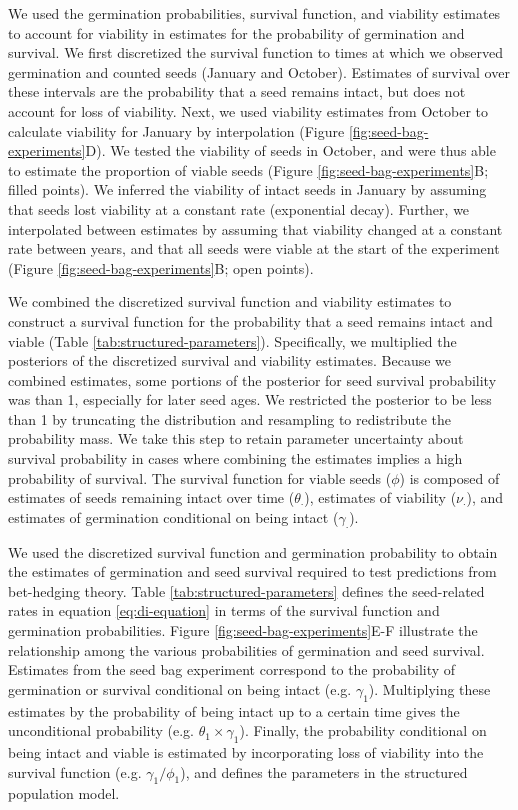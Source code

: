 \documentclass[12pt, oneside, titlepage]{article}   	%
\begin{document}
{We used the germination probabilities, survival function, and viability estimates to account for viability in estimates for the probability of germination and survival. We first discretized the survival function to times at which we observed germination and counted seeds (January and October). Estimates of survival over these intervals are the probability that a seed remains intact, but does not account for loss of viability. Next, we used viability estimates from October to calculate viability for January by interpolation (Figure \ref{fig:seed-bag-experiments}D). We tested the viability of seeds in October, and were thus able to estimate the proportion of viable seeds (Figure \ref{fig:seed-bag-experiments}B; filled points). We inferred the viability of intact seeds in January by assuming that seeds lost viability at a constant rate (exponential decay). Further, we interpolated between estimates by assuming that viability changed at a constant rate between years, and that all seeds were viable at the start of the experiment (Figure \ref{fig:seed-bag-experiments}B; open points). 

We combined the discretized survival function and viability estimates to construct a survival function for the probability that a seed remains intact and viable (Table \ref{tab:structured-parameters}). Specifically, we multiplied the posteriors of the discretized survival and viability estimates. Because we combined estimates, some portions of the posterior for seed survival probability was than 1, especially for later seed ages. We restricted the posterior to be less than 1 by truncating the distribution and resampling to redistribute the probability mass. We take this step to retain parameter uncertainty about survival probability in cases where combining the estimates implies a high probability of survival. The survival function for viable seeds ($\phi$) is composed of estimates of seeds remaining intact over time ($\theta_\cdot$), estimates of viability ($\nu_\cdot$), and estimates of germination conditional on being intact ($\gamma_\cdot$).

We used the discretized survival function and germination probability to obtain the estimates of germination and seed survival required to test predictions from bet-hedging theory. Table \ref{tab:structured-parameters} defines the seed-related rates in equation \ref{eq:di-equation} in terms of the survival function and germination probabilities. Figure \ref{fig:seed-bag-experiments}E-F illustrate the relationship among the various probabilities of germination and seed survival. Estimates from the seed bag experiment correspond to the probability of germination or survival conditional on being intact (e.g. $\gamma_1$). Multiplying these estimates by the probability of being intact up to a certain time gives the unconditional probability (e.g. $\theta_1 \times \gamma_1$). Finally, the probability conditional on being intact and viable is estimated by incorporating loss of viability into the survival function (e.g. $\gamma_1 / \phi_1$), and defines the parameters in the structured population model.

}
\end{document}

